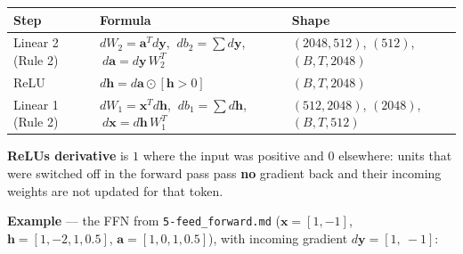 \documentclass[11pt,a4paper,oneside]{report}
\begin{document}
{\def\LTcaptype{none} %
\begin{longtable}[]{@{}>{\raggedright\arraybackslash}p{}>{\raggedright\arraybackslash}p{}>{\raggedright\arraybackslash}p{}@{}}
\toprule\noalign{}
Step & Formula & Shape \\
\midrule\noalign{}
\endhead
\bottomrule\noalign{}
\endlastfoot
Linear 2 (Rule 2) & \(dW_2 = \mathbf{a}^T d\mathbf{y}\), \(\ db_2 = \sum d\mathbf{y}\), \(\ d\mathbf{a} = d\mathbf{y}\,\allowbreak W_2^T\) & \((2048,\allowbreak 512)\), \((512)\), \((B,\allowbreak T,\allowbreak 2048)\) \\
ReLU & \(d\mathbf{h} = d\mathbf{a} \odot [\mathbf{h} > 0]\) & \((B,\allowbreak T,\allowbreak 2048)\) \\
Linear 1 (Rule 2) & \(dW_1 = \mathbf{x}^T d\mathbf{h}\), \(\ db_1 = \sum d\mathbf{h}\), \(\ d\mathbf{x} = d\mathbf{h}\,\allowbreak W_1^T\) & \((512,\allowbreak 2048)\), \((2048)\), \((B,\allowbreak T,\allowbreak 512)\) \\
\end{longtable}
}

\textbf{ReLU\textquotesingle s derivative} is \(1\) where the input was positive and \(0\) elsewhere: units that were switched off in the forward pass pass \textbf{no} gradient back and their incoming weights are not updated for that token.

\textbf{Example} --- the FFN from \texttt{5-feed\_\allowbreak{}forward.\allowbreak{}md} (\(\mathbf{x} = [1, -1]\), \(\mathbf{h} = [1, -2, 1, 0.5]\), \(\mathbf{a} = [1, 0, 1, 0.5]\)), with incoming gradient \(d\mathbf{y} = [1,\ -1]\):
\end{document}
